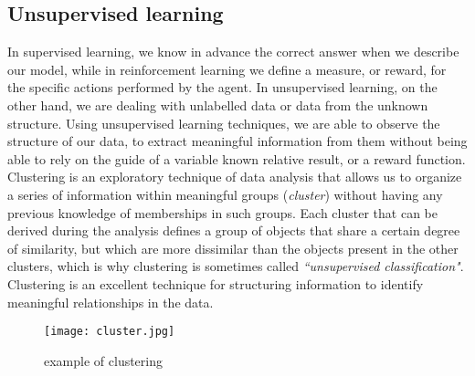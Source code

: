 \subsection{Unsupervised learning}
\label{subsec:unsupervised-learning}
In supervised learning, we know in advance the correct answer when we describe
our model, while in reinforcement learning we define a measure, or reward, for
the specific actions performed by the agent. 
In unsupervised learning, on the other hand, we are dealing with unlabelled data
or data from the unknown structure. Using unsupervised learning techniques, we
are able to observe the structure of our data, to extract meaningful information
from them without being able to rely on the guide of a variable known relative
result, or a reward function. 
Clustering is an exploratory technique of data analysis that allows us to
organize a series of information within meaningful groups (\emph{cluster})
without having any previous knowledge of memberships in such groups. 
Each cluster that can be derived during the analysis defines a group of objects
that share a certain degree of similarity, but which are more dissimilar than
the objects present in the other clusters, which is why clustering is sometimes
called \emph{``unsupervised classification"}. 
Clustering is an excellent technique for structuring information to identify
meaningful relationships in the data.\cite{raschka2016machine}
%
\begin{figure}[!h]
\centering
\texttt{[image: cluster.jpg]}
\caption{example of clustering}
\label{fig:unsupervised-learning-scheme}
\end{figure}
